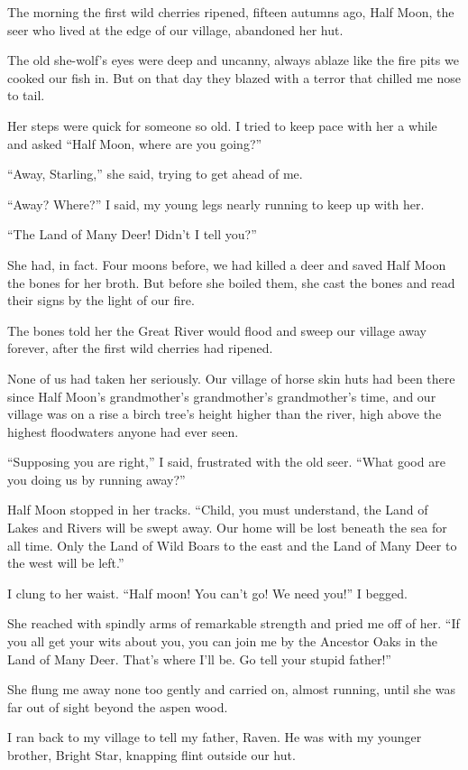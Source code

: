 The morning the first wild cherries ripened, fifteen autumns ago, Half Moon, the seer who lived at the edge of our village, abandoned her hut.

The old she-wolf's eyes were deep and uncanny, always ablaze like the fire pits we cooked our fish in. But on that day they blazed with a terror that chilled me nose to tail.

Her steps were quick for someone so old. I tried to keep pace with her a while and asked ``Half Moon, where are you going?''

``Away, Starling,'' she said, trying to get ahead of me.

``Away? Where?'' I said, my young legs nearly running to keep up with her.

``The Land of Many Deer! Didn't I tell you?''

She had, in fact. Four moons before, we had killed a deer and saved Half Moon the bones for her broth. But before she boiled them, she cast the bones and read their signs by the light of our fire.

The bones told her the Great River would flood and sweep our village away forever, after the first wild cherries had ripened.

None of us had taken her seriously. Our village of horse skin huts had been there since Half Moon's grandmother's grandmother's grandmother's time, and our village was on a rise a birch tree's height higher than the river, high above the highest floodwaters anyone had ever seen.

``Supposing you are right,'' I said, frustrated with the old seer. ``What good are you doing us by running away?''

Half Moon stopped in her tracks. ``Child, you must understand, the Land of Lakes and Rivers will be swept away. Our home will be lost beneath the sea for all time. Only the Land of Wild Boars to the east and the Land of Many Deer to the west will be left.''

I clung to her waist. ``Half moon! You can't go! We need you!'' I begged.

She reached with spindly arms of remarkable strength and pried me off of her. ``If you all get your wits about you, you can join me by the Ancestor Oaks in the Land of Many Deer. That's where I'll be. Go tell your stupid father!''

She flung me away none too gently and carried on, almost running, until she was far out of sight beyond the aspen wood.

I ran back to my village to tell my father, Raven. He was with my younger brother, Bright Star, knapping flint outside our hut.


